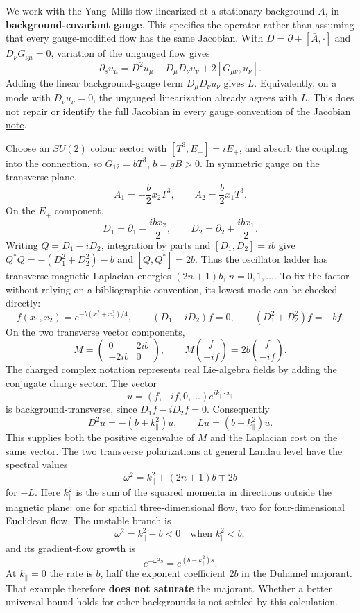\documentclass[11pt,a4paper]{article}
\begin{document}
We work with the Yang--Mills flow linearized at a stationary background
\(\bar A\), in \textbf{background-covariant gauge}. This specifies the
operator rather than assuming that every gauge-modified flow has the
same Jacobian. With \(D=\partial+[\bar A,\cdot]\) and
\(D_\nu G_{\nu\mu}=0\), variation of the ungauged flow gives
\[\partial_su_\mu=D^2u_\mu-D_\mu D_\nu u_\nu
+2[G_{\mu\nu},u_\nu].\] Adding the linear background-gauge term
\(D_\mu D_\nu u_\nu\) gives \(L\). Equivalently, on a mode with
\(D_\nu u_\nu=0\), the ungauged linearization already agrees with \(L\).
This does not repair or identify the full Jacobian in every gauge
convention of \href{flow-jacobian-truncation-error.md}{the Jacobian
note}.

Choose an \(SU(2)\) colour sector with \([T^3,E_+]=iE_+\), and absorb
the coupling into the connection, so \(G_{12}=bT^3\), \(b=gB>0\). In
symmetric gauge on the transverse plane,
\[\bar A_1=-\frac b2x_2T^3,\qquad
\bar A_2=\frac b2x_1T^3.\] On the \(E_+\) component,
\[D_1=\partial_1-\frac{ibx_2}{2},\qquad
D_2=\partial_2+\frac{ibx_1}{2}.\] Writing \(Q=D_1-iD_2\), integration by
parts and \([D_1,D_2]=ib\) give \(Q^*Q=-(D_1^2+D_2^2)-b\) and
\([Q,Q^*]=2b\). Thus the oscillator ladder has transverse
magnetic-Laplacian energies \((2n+1)b\), \(n=0,1,\ldots\). To fix the
factor without relying on a bibliographic convention, its lowest mode
can be checked directly: \[f(x_1,x_2)=e^{-b(x_1^2+x_2^2)/4},\qquad
(D_1-iD_2)f=0,\qquad (D_1^2+D_2^2)f=-bf.\] On the two transverse vector
components, \[M=\begin{pmatrix}0&2ib\\-2ib&0\end{pmatrix},\qquad
M\binom f{-if}=2b\binom f{-if}.\] The charged complex notation
represents real Lie-algebra fields by adding the conjugate charge
sector. The vector
\[u=(f,-if,0,\ldots)e^{ik_\parallel\cdot x_\parallel}\] is
background-transverse, since \(D_1f-iD_2f=0\). Consequently
\[D^2u=-(b+k_\parallel^2)u,\qquad
Lu=(b-k_\parallel^2)u.\] This supplies both the positive eigenvalue of
\(M\) and the Laplacian cost on the same vector. The two transverse
polarizations at general Landau level have the spectral values
\[\omega^2=k_\parallel^2+(2n+1)b\mp2b\] for \(-L\). Here
\(k_\parallel^2\) is the sum of the squared momenta in directions
outside the magnetic plane: one for spatial three-dimensional flow, two
for four-dimensional Euclidean flow. The unstable branch is
\[\omega^2=k_\parallel^2-b<0\quad\text{when }k_\parallel^2<b,\] and its
gradient-flow growth is \[e^{-\omega^2s}=e^{(b-k_\parallel^2)s}.\] At
\(k_\parallel=0\) the rate is \(b\), half the exponent coefficient
\(2b\) in the Duhamel majorant. That example therefore \textbf{does not
saturate} the majorant. Whether a better universal bound holds for other
backgrounds is not settled by this calculation.
\end{document}

